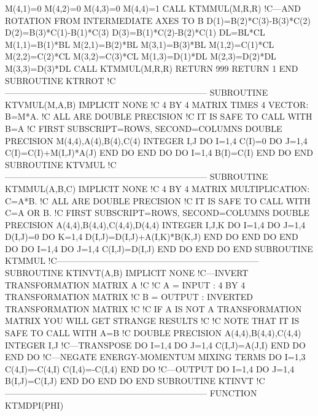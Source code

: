       M(4,1)=0
      M(4,2)=0
      M(4,3)=0
      M(4,4)=1
      CALL KTMMUL(M,R,R)
!C---AND ROTATION FROM INTERMEDIATE AXES TO B
      D(1)=B(2)*C(3)-B(3)*C(2)
      D(2)=B(3)*C(1)-B(1)*C(3)
      D(3)=B(1)*C(2)-B(2)*C(1)
      DL=BL*CL
      M(1,1)=B(1)*BL
      M(2,1)=B(2)*BL
      M(3,1)=B(3)*BL
      M(1,2)=C(1)*CL
      M(2,2)=C(2)*CL
      M(3,2)=C(3)*CL
      M(1,3)=D(1)*DL
      M(2,3)=D(2)*DL
      M(3,3)=D(3)*DL
      CALL KTMMUL(M,R,R)
      RETURN
 999  RETURN 1
    END SUBROUTINE KTRROT
!C-----------------------------------------------------------------------
    SUBROUTINE KTVMUL(M,A,B)
      IMPLICIT NONE
!C   4 BY 4 MATRIX TIMES 4 VECTOR: B=M*A.
!C   ALL ARE DOUBLE PRECISION
!C   IT IS SAFE TO CALL WITH B=A
!C   FIRST SUBSCRIPT=ROWS, SECOND=COLUMNS
      DOUBLE PRECISION M(4,4),A(4),B(4),C(4)
      INTEGER I,J
      DO I=1,4
         C(I)=0
         DO J=1,4
            C(I)=C(I)+M(I,J)*A(J)
         END DO
      END DO
      DO I=1,4
         B(I)=C(I)
      END DO
    END SUBROUTINE KTVMUL
!C-----------------------------------------------------------------------
    SUBROUTINE KTMMUL(A,B,C)
      IMPLICIT NONE
!C   4 BY 4 MATRIX MULTIPLICATION: C=A*B.
!C   ALL ARE DOUBLE PRECISION
!C   IT IS SAFE TO CALL WITH C=A OR B.
!C   FIRST SUBSCRIPT=ROWS, SECOND=COLUMNS
      DOUBLE PRECISION A(4,4),B(4,4),C(4,4),D(4,4)
      INTEGER I,J,K
      DO I=1,4
         DO J=1,4
            D(I,J)=0
            DO K=1,4
               D(I,J)=D(I,J)+A(I,K)*B(K,J)
            END DO
         END DO
      END DO
      DO I=1,4
         DO J=1,4
            C(I,J)=D(I,J)
         END DO
      END DO
    END SUBROUTINE KTMMUL
!C-----------------------------------------------------------------------
    SUBROUTINE KTINVT(A,B)
      IMPLICIT NONE
!C---INVERT TRANSFORMATION MATRIX A
!C
!C   A = INPUT  : 4 BY 4 TRANSFORMATION MATRIX
!C   B = OUTPUT : INVERTED TRANSFORMATION MATRIX
!C
!C   IF A IS NOT A TRANSFORMATION MATRIX YOU WILL GET STRANGE RESULTS
!C
!C   NOTE THAT IT IS SAFE TO CALL WITH A=B
!C
      DOUBLE PRECISION A(4,4),B(4,4),C(4,4)
      INTEGER I,J
!C---TRANSPOSE
      DO I=1,4
         DO J=1,4
            C(I,J)=A(J,I)
         END DO
      END DO
!C---NEGATE ENERGY-MOMENTUM MIXING TERMS
      DO I=1,3
         C(4,I)=-C(4,I)
         C(I,4)=-C(I,4)
      END DO
!C---OUTPUT
      DO I=1,4
         DO J=1,4
            B(I,J)=C(I,J)
         END DO
      END DO
    END SUBROUTINE KTINVT
!C-----------------------------------------------------------------------
\nwendcode{}\plusendmoddef
    FUNCTION KTMDPI(PHI)
